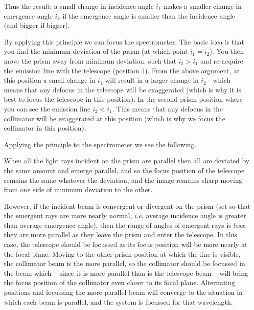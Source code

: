\documentclass[12pt]{article}
\newcommand{\ie}{ {\em i.e. }}
\begin{document}
\vspace*{3mm}

{\large Thus the result:  a small change in incidence angle $i_1$ makes a smaller change in emergence angle $i_2$ if the emergence angle is smaller than the incidence angle (and bigger if bigger).}\\

\medskip

\noindent
By applying this principle we can focus the spectrometer. The basic idea is that you find the minimum deviation of the prism (at which point $i_1=i_2$). You then move the prism away from minimum deviation, such that $i_2>i_1$ and re-acquire the emission line with the telescope (position 1). From the above argument, at this position a small change in $i_1$ will result in a larger change in $i_2$ - which means that any defocus in the telescope will be exaggerated (which is why it is best to focus the telescope in this position). In the second prism position where you can see the emission line $i_2<i_1$. This means that any defocus in the collimator will be exaggerated at this position (which is why we focus the collimator in this position).


Applying the principle to the spectrometer we see the following.

When all the light rays incident on the prism are parallel then all are deviated by the same amount and emerge parallel, and so the focus position of the telescope remains the same whatever the deviation, and the image remains sharp  moving from one side of minimum deviation to the other. 

However, if the incident beam is convergent or divergent on the prism (set so that the emergent rays are  more nearly normal, \ie average incidence angle is greater than average emergence angle), then the range of angles of emergent rays is {\sl less\/}: they are more parallel as they leave the prism and enter the telescope. In this case, the telescope should be focussed as its focus position will be more nearly at the focal plane. Moving to the other prism position at which the line is visible, the collimator beam is the more parallel, so the collimator should be focussed in the beam which -- since it is more parallel than is the telescope beam -- will bring the focus position of the collimator even closer to its focal plane. Alternating positions and focussing the more parallel beam will converge to the situation in which each beam is parallel, and the system is focussed for that wavelength.
\end{document}
